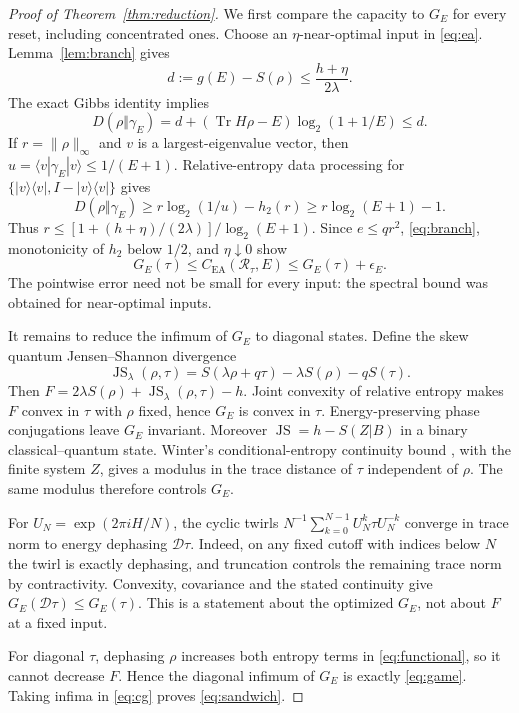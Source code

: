 \documentclass[11pt]{article}
\DeclareMathOperator{\Tr}{Tr}
\DeclareMathOperator{\JS}{JS}
\newcommand{\R}{\mathcal R}
\newcommand{\D}{\mathcal D}
\newcommand{\CE}{C_{\mathrm{EA}}}
\newcommand{\gE}{\gamma_E}
\newcommand{\hbin}{h_2}
\begin{document}
\begin{proof}[Proof of Theorem~\ref{thm:reduction}]
We first compare the capacity to $G_E$ for every reset, including concentrated ones. Choose an $\eta$-near-optimal input in \eqref{eq:ea}. Lemma~\ref{lem:branch} gives
\[
 d:=g(E)-S(\rho)\le\frac{h+\eta}{2\lambda}.
\]
The exact Gibbs identity implies
\[
 D(\rho\Vert\gE)=d+(\Tr H\rho-E)\log_2(1+1/E)\le d.
\]
If $r=\|\rho\|_\infty$ and $v$ is a largest-eigenvalue vector, then $u=\langle v|\gE|v\rangle\le1/(E+1)$. Relative-entropy data processing for $\{|v\rangle\langle v|,I-|v\rangle\langle v|\}$ gives
\[
 D(\rho\Vert\gE)\ge r\log_2(1/u)-\hbin(r)
 \ge r\log_2(E+1)-1.
\]
Thus $r\le[1+(h+\eta)/(2\lambda)]/\log_2(E+1)$. Since $e\le qr^2$, \eqref{eq:branch}, monotonicity of $\hbin$ below $1/2$, and $\eta\downarrow0$ show
\begin{equation}\label{eq:cg}
 G_E(\tau)\le\CE(\R_\tau,E)\le G_E(\tau)+\epsilon_E.
\end{equation}
The pointwise error need not be small for every input: the spectral bound was obtained for near-optimal inputs.

It remains to reduce the infimum of $G_E$ to diagonal states. Define the skew quantum Jensen--Shannon divergence
\[
 \JS_\lambda(\rho,\tau)=S(\lambda\rho+q\tau)-\lambda S(\rho)-qS(\tau).
\]
Then $F=2\lambda S(\rho)+\JS_\lambda(\rho,\tau)-h$. Joint convexity of relative entropy makes $F$ convex in $\tau$ with $\rho$ fixed, hence $G_E$ is convex in $\tau$. Energy-preserving phase conjugations leave $G_E$ invariant. Moreover $\JS=h-S(Z|B)$ in a binary classical--quantum state. Winter's conditional-entropy continuity bound \cite[Lemma~2]{winter}, with the finite system $Z$, gives a modulus in the trace distance of $\tau$ independent of $\rho$. The same modulus therefore controls $G_E$.

For $U_N=\exp(2\pi iH/N)$, the cyclic twirls $N^{-1}\sum_{k=0}^{N-1}U_N^k\tau U_N^{-k}$ converge in trace norm to energy dephasing $\D\tau$. Indeed, on any fixed cutoff with indices below $N$ the twirl is exactly dephasing, and truncation controls the remaining trace norm by contractivity. Convexity, covariance and the stated continuity give $G_E(\D\tau)\le G_E(\tau)$. This is a statement about the optimized $G_E$, not about $F$ at a fixed input.

For diagonal $\tau$, dephasing $\rho$ increases both entropy terms in \eqref{eq:functional}, so it cannot decrease $F$. Hence the diagonal infimum of $G_E$ is exactly \eqref{eq:game}. Taking infima in \eqref{eq:cg} proves \eqref{eq:sandwich}.
\end{proof}
\end{document}
